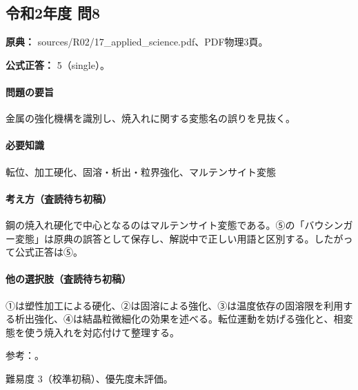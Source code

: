 \subsection{令和2年度 問8}
\label{q:r02-reg-applied-08}

\noindent\textbf{原典：} sources/R02/17\_applied\_science.pdf、PDF物理3頁。

\textbf{公式正答：} 5（single）。

\paragraph{問題の要旨} 金属の強化機構を識別し、焼入れに関する変態名の誤りを見抜く。

\paragraph{必要知識} 転位、加工硬化、固溶・析出・粒界強化、マルテンサイト変態

\paragraph{考え方（査読待ち初稿）} 鋼の焼入れ硬化で中心となるのはマルテンサイト変態である。⑤の「バウシンガー変態」は原典の誤答として保存し、解説中で正しい用語と区別する。したがって公式正答は⑤。

\paragraph{他の選択肢（査読待ち初稿）} ①は塑性加工による硬化、②は固溶による強化、③は温度依存の固溶限を利用する析出強化、④は結晶粒微細化の効果を述べる。転位運動を妨げる強化と、相変態を使う焼入れを対応付けて整理する。

\par 参考：\cite{martensite_cambridge}。

\par 難易度 3（校準初稿）、優先度未評価。
